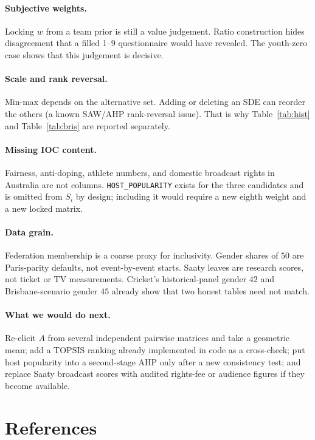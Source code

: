 \documentclass[12pt]{article}
\begin{document}
\paragraph{Subjective weights.}
Locking \(w\) from a team prior is still a value judgement. Ratio construction
hides disagreement that a filled 1--9 questionnaire would have revealed. The
youth-zero case shows that this judgement is decisive.

\paragraph{Scale and rank reversal.}
Min-max depends on the alternative set. Adding or deleting an SDE can reorder the
others (a known SAW/AHP rank-reversal issue). That is why Table~\ref{tab:hist} and
Table~\ref{tab:bris} are reported separately.

\paragraph{Missing IOC content.}
Fairness, anti-doping, athlete numbers, and domestic broadcast rights in Australia
are not columns. \texttt{HOST\_POPULARITY} exists for the three candidates and is
omitted from \(S_i\) by design; including it would require a new eighth weight and a
new locked matrix.

\paragraph{Data grain.}
Federation membership is a coarse proxy for inclusivity. Gender shares of \(50\)
are Paris-parity defaults, not event-by-event starts. Saaty leaves are research
scores, not ticket or TV measurements. Cricket's historical-panel gender \(42\) and
Brisbane-scenario gender \(45\) already show that two honest tables need not match.

\paragraph{What we would do next.}
Re-elicit \(A\) from several independent pairwise matrices and take a geometric
mean; add a TOPSIS ranking already implemented in code as a cross-check; put host
popularity into a second-stage AHP only after a new consistency test; and replace
Saaty broadcast scores with audited rights-fee or audience figures if they become
available.

\section*{References}
\end{document}
